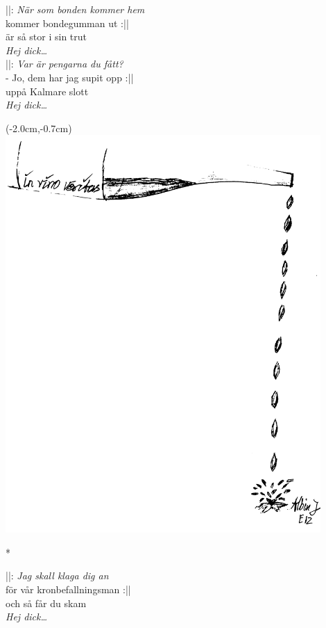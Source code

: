 \noindent ||: \textit{När som bonden kommer hem}\\
\noindent kommer bondegumman ut :||\\
\noindent är så stor i sin trut\\
\noindent \textit{Hej dick…}\\

\noindent ||: \textit{Var är pengarna du fått?}\\
\noindent - Jo, dem har jag supit opp :||\\
\noindent uppå Kalmare slott\\
\noindent \textit{Hej dick…}\\


\newpage
\noBackground

\begin{textblock*}{3cm}(-2.0cm,-0.7cm) %
    \includegraphics[width=12cm]{./bilder/in_vino_veritas.png}
\end{textblock*}

*\vspace{1cm}

\noindent ||: \textit{Jag skall klaga dig an}\\
\noindent för vår kronbefallningsman :||\\
\noindent och så får du skam\\
\noindent \textit{Hej dick…}\\

